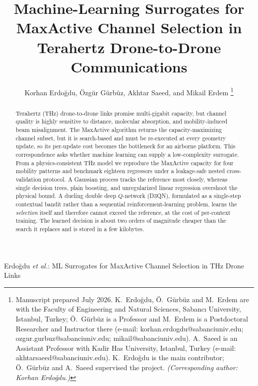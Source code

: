 \documentclass[journal]{IEEEtran}
\begin{document}
\title{Machine-Learning Surrogates for MaxActive Channel Selection in\\
Terahertz Drone-to-Drone Communications}

\author{Korhan Erdo\u{g}du, \"Ozg\"ur G\"urb\"uz, Akhtar Saeed, and Mikail Erdem%
\thanks{Manuscript prepared July 2026. K.~Erdo\u{g}du, \"O.~G\"urb\"uz and M.~Erdem are
with the Faculty of Engineering and Natural Sciences, Sabanc\i{} University, Istanbul,
Turkey; \"O.~G\"urb\"uz is a Professor and M.~Erdem is a Postdoctoral Researcher and
Instructor there (e-mail: korhan.erdogdu@sabanciuniv.edu; ozgur.gurbuz@sabanciuniv.edu;
mikail@sabanciuniv.edu). A.~Saeed is an Assistant Professor with Kadir Has University,
Istanbul, Turkey (e-mail: akhtarsaeed@sabanciuniv.edu).
K.~Erdo\u{g}du is the main contributor; \"O.~G\"urb\"uz and A.~Saeed supervised the
project. \emph{(Corresponding author: Korhan Erdo\u{g}du.)}}}

%
{Erdo\u{g}du \MakeLowercase{\textit{et al.}}: ML Surrogates for MaxActive Channel Selection in THz Drone Links}

\maketitle
\thispagestyle{plain}   %

\begin{abstract}
Terahertz (THz) drone-to-drone links promise multi-gigabit capacity, but channel quality
is highly sensitive to distance, molecular absorption, and mobility-induced beam
misalignment. The MaxActive algorithm returns the capacity-maximizing channel subset, but
it is search-based and must be re-executed at every geometry update, so its per-update
cost becomes the bottleneck for an airborne platform. This correspondence asks whether
machine learning can supply a low-complexity surrogate. From a physics-consistent THz
model we reproduce the MaxActive capacity for four mobility patterns and benchmark
eighteen regressors under a leakage-safe nested cross-validation protocol. A Gaussian
process tracks the reference most closely, whereas single decision trees, plain boosting,
and unregularized linear regression overshoot the physical bound. A dueling double deep
$Q$-network (D3QN), formulated as a single-step contextual bandit rather than a sequential
reinforcement-learning problem, learns the \emph{selection} itself and therefore cannot
exceed the reference, at the cost of per-context training. The learned decision is about
two orders of magnitude cheaper than the search it replaces and is stored in a few
kilobytes.
\end{abstract}
\end{document}
